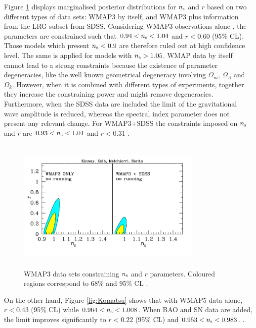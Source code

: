 \documentclass{rmaa}
\begin{document}
Figure \ref{fig:Kinney} displays marginalised posterior distributions for $n_{\rm s}$ and $r$ based on
two different types of data sets: WMAP3 by itself, and WMAP3 plus information from the 
LRG subset from SDSS. Considering WMAP3 observations alone \citep{Kinney}, 
the parameters are constrained such that $0.94 < n_{\rm s} < 1.04$
and $r<0.60$ (95\% CL). Those models which present  $n_{\rm s}<0.9$ are  therefore ruled out at
high confidence level. The same is applied for models with $n_{\rm s} > 1.05$. 
%
WMAP data by itself  cannot lead to a strong constraints because the existence of parameter 
degeneracies, like the well known geometrical degeneracy involving $\Omega_m$, 
$\Omega_{\Lambda}$ and $\Omega_k$. However, when it is combined with different types 
of experiments, together they increase the constraining power and might remove degeneracies. 
Furthermore, when the SDSS data are included the limit of the gravitational wave amplitude 
is reduced, whereas the spectral index parameter does not present any relevant change. 
For WMAP3+SDSS the constraints imposed on $n_{\rm s}$ and $r$ are $0.93<n_{\rm s}<1.01$ and
$r<0.31$ \citep{Kinney}. 

\begin{figure}[h!]
\begin{center}
 \includegraphics[trim = 1mm 10mm -10mm 4mm, clip, width=9cm, height=6.5cm]{rn.png}
\caption{ WMAP3 data sets constraining 
$n_{\rm s}$ and $r$ parameters. Coloured regions correspond to 68\% and 95\% CL  \citep{Kinney}.}
\label{fig:Kinney}
\end{center}
\end{figure}

On the other hand, Figure \ref{fig:Komatsu} shows that with WMAP5 data alone,   
$r < 0.43$ (95\% CL) while $0.964< n_{\rm s}<1.008$.
When BAO and SN data are added, the limit improves significantly to 
$r < 0.22$ (95\% CL) and $0.953< n_{\rm s}<0.983$.
 \citep{Komatsu}.
\\
\end{document}

